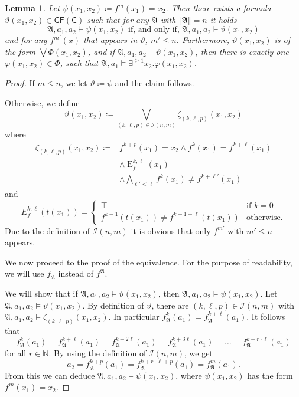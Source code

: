 \documentclass[a4paper,11pt,DIV=15]{scrartcl} %
\renewcommand{\phi}{\varphi}
\theoremstyle{plain}
\newtheorem{lemma}[theorem]{Lemma}
\theoremstyle{definition}
\newcommand{\GFC}{\mathsf{GF}(\mathsf{C})}
\renewcommand{\theta}{\vartheta}
\begin{document}
\begin{lemma}
	Let $\psi(x_1,x_2)\coloneqq f^m(x_1)=x_2$. 
	Then there exists a formula $\theta(x_1,x_2)\in \GFC$ such that for any $\mathfrak A$ with $\Vert \mathfrak A\Vert=n$ it holds
	$$\mathfrak A,a_1,a_2 \models \psi(x_1,x_2) \text{ if, and only if, } \mathfrak A,a_1,a_2 \models \theta(x_1,x_2)$$ 
	and for any $f^{m'}(x)$ that appears in $\theta$, $m'\leq n$.
	Furthermore, $\theta(x_1,x_2)$ is of the form $\bigvee \Phi(x_1,x_2)$, and if $\mathfrak A,a_1,a_2\models \theta(x_1,x_2)$, then there is exactly one $\phi(x_1,x_2)\in\Phi$, such that $\mathfrak A,a_1\models \exists^{\geq 1} x_2 . \phi(x_1,x_2)$.
	\label{Simple_fm_to_fk}
\end{lemma}
\begin{proof}
	If $m \leq n$, we let $\theta\coloneqq\psi$ and the claim follows.
	
	Otherwise, we define
	$$\theta(x_1,x_2)\coloneqq \bigvee_{(k,\ell,p)\in \mathcal I(n,m)} \zeta_{(k,\ell,p)}(x_1,x_2)$$
	where
	\begin{align*}
		\zeta_{(k,\ell,p)}(x_1,x_2)\coloneqq & f^{k+p}(x_1)=x_2 \land f^{k}(x_1)=f^{k+\ell}(x_1) \\
		& \land \operatorname{E}^{k,\ell}_{f}(x_1)  \\
		& \land \bigwedge_{\ell'<\ell}f^{k}(x_1)\neq f^{k+\ell'}(x_1)
	\end{align*}
	and
	$$E^{k,\ell}_{f}(t(x_1))=\begin{cases}
		\top & \text{if } k=0 \\
		f^{k-1}(t(x_1))\neq f^{k-1+\ell}(t(x_1)) & \text{otherwise}.
	\end{cases}$$
	Due to the definition of $\mathcal I(n,m)$ it is obvious that only $f^{m'}$ with $m'\leq n$ appears.
	
	We now proceed to the proof of the equivalence.
	For the purpose of readability, we will use $f_{\mathfrak A}$ instead of $f^{\mathfrak A}$.
	
	We will show that if $\mathfrak A,a_1,a_2 \models \theta(x_1,x_2)$, then $\mathfrak A,a_1,a_2 \models \psi(x_1,x_2)$.
	Let $\mathfrak A,a_1,a_2 \models \theta(x_1,x_2)$. 
	By definition of $\theta$, there are $(k,\ell,p)\in \mathcal I(n,m)$ with $\mathfrak A,a_1,a_2 \models \zeta_{(k,\ell,p)}(x_1,x_2)$.
	In particular $f_{\mathfrak A}^{k}(a_1)=f_{\mathfrak A}^{k+\ell}(a_1)$. It follows that
	$$f_{\mathfrak A}^{k}(a_1)=f_{\mathfrak A}^{k+\ell}(a_1)=f_{\mathfrak A}^{k+2\ell}(a_1)=f_{\mathfrak A}^{k+3\ell}(a_1) = \dots = f_{\mathfrak A}^{k+r\cdot \ell}(a_1)$$
	for all $r\in \mathbb N$. By using the definition of $\mathcal{I}(n,m)$, we get
	$$a_2 =f_{\mathfrak A}^{k+p}(a_1) = f_{\mathfrak A}^{k+r\cdot \ell + p}(a_1)=f_{\mathfrak A}^{m}(a_1).$$
	From this we can deduce $\mathfrak A,a_1,a_2\models \psi(x_1,x_2)$, where $\psi(x_1,x_2)$ has the form $f^{m}(x_1)=x_2$.
	

\end{proof}
\end{document}
